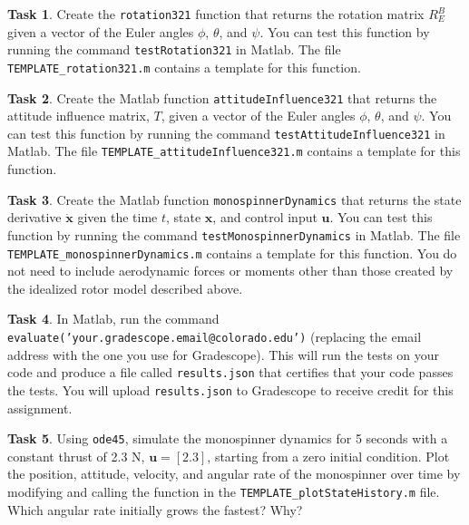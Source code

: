 \documentclass{article}
\theoremstyle{definition}
\newtheorem{task}{Task}
\begin{document}
\begin{task}
    Create the \texttt{rotation321} function that returns the rotation matrix $R^B_E$ given a vector of the Euler angles $\phi$, $\theta$, and $\psi$. You can test this function by running the command \texttt{testRotation321} in Matlab. The file \texttt{TEMPLATE\_rotation321.m} contains a template for this function.
\end{task}

\begin{task}
    Create the Matlab function \texttt{attitudeInfluence321} that returns the attitude influence matrix, $T$, given a vector of the Euler angles $\phi$, $\theta$, and $\psi$. You can test this function by running the command \texttt{testAttitudeInfluence321} in Matlab. The file \texttt{TEMPLATE\_attitudeInfluence321.m} contains a template for this function.
\end{task}

\begin{task}
    Create the Matlab function \texttt{monospinnerDynamics} that returns the state derivative $\dot{\textbf{x}}$ given the time $t$, state $\textbf{x}$, and control input $\textbf{u}$. You can test this function by running the command \texttt{testMonospinnerDynamics} in Matlab. The file \texttt{TEMPLATE\_monospinnerDynamics.m} contains a template for this function. You do not need to include aerodynamic forces or moments other than those created by the idealized rotor model described above.
\end{task}

\begin{task}
    In Matlab, run the command \texttt{evaluate('your.gradescope.email@colorado.edu')} (replacing the email address with the one you use for Gradescope). This will run the tests on your code and produce a file called \texttt{results.json} that certifies that your code passes the tests. You will upload \texttt{results.json} to Gradescope to receive credit for this assignment.
\end{task}

\begin{task}\label{task:powered}
    Using \texttt{ode45}, simulate the monospinner dynamics for 5 seconds with a constant thrust of 2.3 N, $\textbf{u}=[2.3]$, starting from a zero initial condition. Plot the position, attitude, velocity, and angular rate of the monospinner over time by modifying and calling the function in the \texttt{TEMPLATE\_plotStateHistory.m} file. Which angular rate initially grows the fastest? Why?
\end{task}
\end{document}
